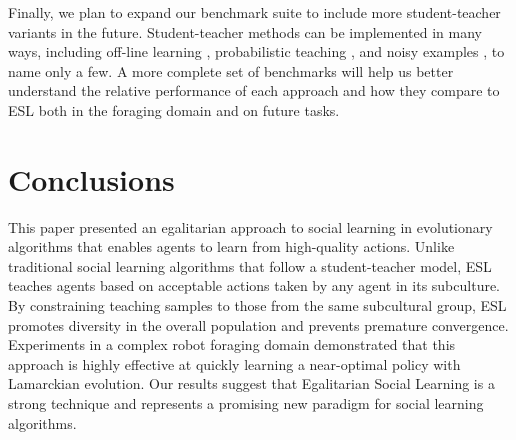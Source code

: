 \documentclass{sig-alternate}
\begin{document}
Finally, we plan to expand our benchmark suite to include more student-teacher variants in the future. Student-teacher methods can be implemented in many ways, including off-line learning \cite{acerbi2007social}, probabilistic teaching \cite{haasdijk2008social}, and noisy examples \cite{denaro1996cultural}, to name only a few. A more complete set of benchmarks will help us better understand the relative performance of each approach and how they compare to ESL both in the foraging domain and on future tasks.


\section{Conclusions}
\label{sec:conclusions}

This paper presented an egalitarian approach to social learning in evolutionary algorithms that enables agents to learn from high-quality actions. Unlike traditional social learning algorithms that follow a student-teacher model, ESL teaches agents based on acceptable actions taken by any agent in its subculture. By constraining teaching samples to those from the same subcultural group, ESL promotes diversity in the overall population and prevents premature convergence. Experiments in a complex robot foraging domain demonstrated that this approach is highly effective at quickly learning a near-optimal policy with Lamarckian evolution. Our results suggest that Egalitarian Social Learning is a strong technique and represents a promising new paradigm for social learning algorithms.



\end{document}
